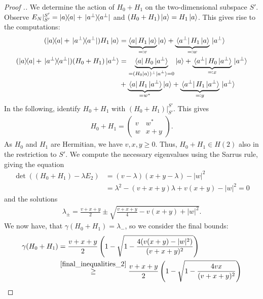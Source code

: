 \documentclass[10pt]{amsart}
\theoremstyle{definition}
\theoremstyle{remark}
\begin{document}
\begin{proof}[Proof {\cite[p. 74]{Childs_2014}}.]
        We determine the action of \(H_0+H_1\) on the two-dimensional subspace \(S'\). Observe \(E_N|_{S'}^{S'} = \ketbra{a}{a}+\ketbra*{a^\perp}{a^\perp}\) and \((H_0+H_1)\ket{a} = H_1\ket{a}\). This gives rise to the computations:
        \begin{align}
            (\ketbra{a}{a}+\ketbra*{a^\perp}{a^\perp})H_1\ket{a} &= \underbrace{\bra{a}H_1\ket{a}}_{\eqqcolon v} \ket{a} + \underbrace{\bra*{a^\perp}H_1\ket{a}}_{\eqqcolon w} \ket*{a^\perp}\\
            (\ketbra{a}{a}+\ketbra*{a^\perp}{a^\perp})(H_0+H_1)\ket*{a^\perp} &= \underbrace{\bra{a}H_0\ket*{a^\perp}}_{=(H_0\ket{a})^\perp\ket*{a^\perp} = 0}\ket{a}+\underbrace{\bra*{a^\perp}H_0\ket*{a^\perp}}_{\eqqcolon x}\ket*{a^\perp}\\
            &+\underbrace{\bra*{a}H_1\ket*{a^\perp}}_{=w^*}\ket{a}+\underbrace{\bra*{a^\perp}H_1\ket*{a^\perp}}_{\eqqcolon y}\ket*{a^\perp}
        \end{align}
        In the following, identify \(H_0+H_1\) with \((H_0+H_1)|_{S'}^{S'}\). This gives
        \begin{align}
            H_0+H_1 = \begin{pmatrix}
                v & w^*\\
                w & x+y
            \end{pmatrix}.
        \end{align}
        As \(H_0\) and \(H_1\) are Hermitian, we have \(v, x, y \geq 0\). Thus, \(H_0+H_1 \in H(2)\) also in the restriction to \(S'\). We compute the necessary eigenvalues using the Sarrus rule, giving the equation
        \begin{align}
            \det((H_0+H_1)-\lambda E_2) &= (v-\lambda)(x+y-\lambda)-|w|^2\\
            &= \lambda^2-(v+x+y)\lambda+v(x+y)-|w|^2 = 0
        \end{align}
        and the solutions
        \begin{align}
            \lambda_\pm = \frac{v+x+y}{2} \pm \sqrt{\frac{v+x+y}{4}-v(x+y)+|w|^2}. \label{restricted_hamiltonian_sum_eigenvalues}
        \end{align}
        We now have, that \(\gamma(H_0+H_1) = \lambda_-\), so we consider the final bounds:
        \begin{align}
            \gamma(H_0+H_1) &= \frac{v+x+y}{2} \left(1-\sqrt{1-\frac{4(v(x+y)-|w|^2)}{(v+x+y)^2}}\right)\\
            &\overset{\ref{final_inequalities_2}}{\geq} \frac{v+x+y}{2} \left(1-\sqrt{1-\frac{4vx}{(v+x+y)^2}}\right)\\

\end{align}
\end{proof}
\end{document}
